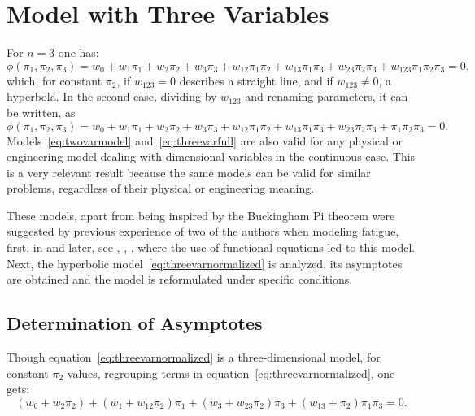\documentclass[
	11pt, %
	fleqn, %
	a4paper, %
]{LegrandOrangeBook}
\begin{document}
\section{Model with Three Variables}
For $n = 3$ one has:
\begin{equation}
\phi(\pi_1,\pi_2,\pi_3) = w_0 + w_1\pi_1 + w_2\pi_2 + w_3\pi_3 + w_{12}\pi_1\pi_2 + w_{13}\pi_1\pi_3 + w_{23}\pi_2\pi_3 + w_{123}\pi_1\pi_2\pi_3 = 0,
\label{eq:threevarfull}
\end{equation}
which, for constant $\pi_2$, if $w_{123} = 0$ describes a straight line, and if $w_{123} \neq 0$, a hyperbola. In the second case, dividing by $w_{123}$ and renaming parameters, it can be written, as
\begin{equation}
\phi(\pi_1,\pi_2,\pi_3) = w_0 + w_1\pi_1 + w_2\pi_2 + w_3\pi_3 + w_{12}\pi_1\pi_2 + w_{13}\pi_1\pi_3 + w_{23}\pi_2\pi_3 + \pi_1\pi_2\pi_3 = 0.
\label{eq:threevarnormalized}
\end{equation}
Models~\eqref{eq:twovarmodel} and~\eqref{eq:threevarfull} are also valid for any physical or engineering model dealing with dimensional variables in the continuous case. This is a very relevant result because the same models can be valid for similar problems, regardless of their physical or engineering meaning.

These models, apart from being inspired by the Buckingham Pi theorem were suggested by previous experience of two of the authors when modeling fatigue, first, in \cite{Castillo1985} and later, see \cite{castillo2009unified}, \cite{koller2009experimental}, \cite{castillo2009statistical}, where the use of functional equations led to this model.
Next, the hyperbolic model~\eqref{eq:threevarnormalized} is analyzed, its asymptotes are obtained and the model is reformulated under specific conditions.
\subsection{Determination of Asymptotes}

Though equation~\eqref{eq:threevarnormalized} is a three-dimensional model, for constant $\pi_2$ values, regrouping terms in equation~\eqref{eq:threevarnormalized}, one gets:
\begin{equation}
(w_0 + w_2\pi_2) + (w_1 + w_{12}\pi_2)\pi_1 + (w_3 + w_{23}\pi_2)\pi_3 + (w_{13} + \pi_2)\pi_1\pi_3 = 0.
\label{eq:regrouped}
\end{equation}
\end{document}
